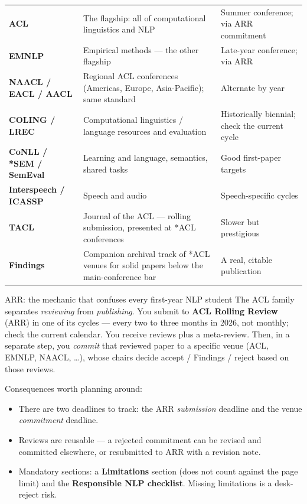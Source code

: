 \documentclass[11pt,a4paper]{article}
\begin{document}
\begin{table}[h]
\centering
\small
\begin{tabularx}{\textwidth}{L{2.4cm} X L{3.5cm}}
\toprule
{} &  &  \\
\midrule
{}
\textbf{ACL} & The flagship: all of computational linguistics and NLP &
Summer conference; via ARR commitment \\
\textbf{EMNLP} & Empirical methods --- the other flagship &
Late-year conference; via ARR \\
\textbf{NAACL / EACL / AACL} & Regional ACL conferences (Americas, Europe,
Asia-Pacific); same standard & Alternate by year \\
\textbf{COLING / LREC} & Computational linguistics / language resources and
evaluation & Historically biennial; check the current cycle \\
\textbf{CoNLL / *SEM / SemEval} & Learning and language, semantics, shared
tasks & Good first-paper targets \\
\textbf{Interspeech / ICASSP} & Speech and audio & Speech-specific cycles \\
\textbf{TACL} & Journal of the ACL --- rolling submission, presented at *ACL
conferences & Slower but prestigious \\
\textbf{Findings} & Companion archival track of *ACL venues for solid papers
below the main-conference bar & A real, citable publication \\
\bottomrule
\end{tabularx}
\end{table}

\begin{cbox}{ARR: the mechanic that confuses every first-year NLP student}
The ACL family separates \emph{reviewing} from \emph{publishing}. You submit to
\textbf{ACL Rolling Review} (ARR) in one of its cycles --- every two to three
months in 2026, not monthly; check the current calendar. You
receive reviews plus a meta-review. Then, in a separate step, you
\emph{commit} that reviewed paper to a specific venue (ACL, EMNLP, NAACL,
\ldots), whose chairs decide accept / Findings / reject based on those reviews.

Consequences worth planning around:
\begin{itemize}
  \item There are two deadlines to track: the ARR \emph{submission} deadline
        and the venue \emph{commitment} deadline.
  \item Reviews are reusable --- a rejected commitment can be revised and
        committed elsewhere, or resubmitted to ARR with a revision note.
  \item Mandatory sections: a \textbf{Limitations} section (does not count
        against the page limit) and the \textbf{Responsible NLP checklist}.
        Missing limitations is a desk-reject risk.
\end{itemize}
\end{cbox}
\end{document}
